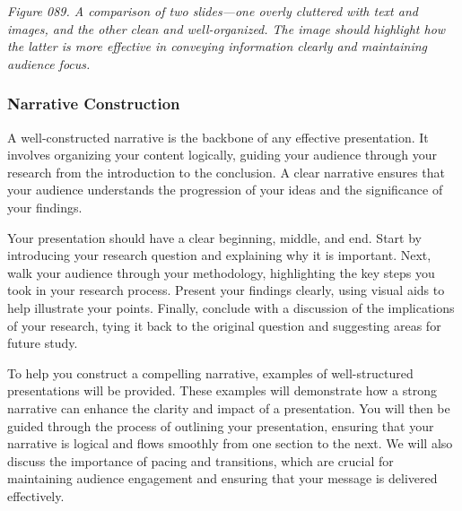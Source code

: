 \documentclass[
]{book}
\begin{document}
\emph{Figure 089. A comparison of two slides---one overly cluttered with text and images, and the other clean and well-organized. The image should highlight how the latter is more effective in conveying information clearly and maintaining audience focus.}

\subsubsection{Narrative Construction}\label{narrative-construction}

A well-constructed narrative is the backbone of any effective presentation. It involves organizing your content logically, guiding your audience through your research from the introduction to the conclusion. A clear narrative ensures that your audience understands the progression of your ideas and the significance of your findings.

Your presentation should have a clear beginning, middle, and end. Start by introducing your research question and explaining why it is important. Next, walk your audience through your methodology, highlighting the key steps you took in your research process. Present your findings clearly, using visual aids to help illustrate your points. Finally, conclude with a discussion of the implications of your research, tying it back to the original question and suggesting areas for future study.

To help you construct a compelling narrative, examples of well-structured presentations will be provided. These examples will demonstrate how a strong narrative can enhance the clarity and impact of a presentation. You will then be guided through the process of outlining your presentation, ensuring that your narrative is logical and flows smoothly from one section to the next. We will also discuss the importance of pacing and transitions, which are crucial for maintaining audience engagement and ensuring that your message is delivered effectively.
\end{document}
